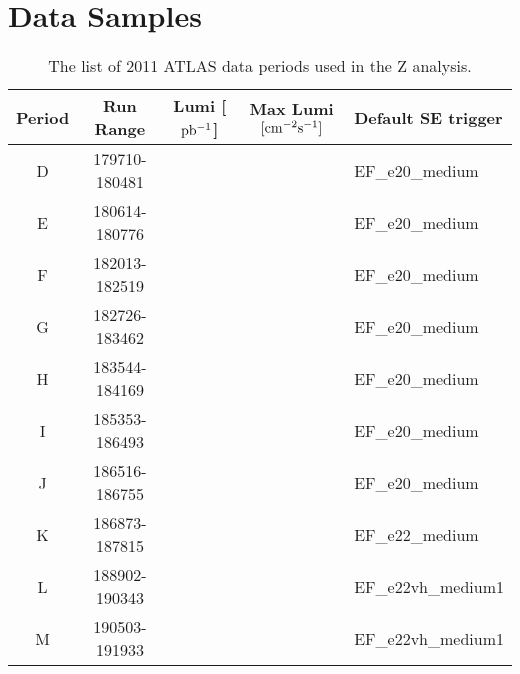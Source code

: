 \chapter{Data Samples}
\label{sec:DataSamples}

\begin{table}[ht!]
\centering
\begin{tabular}{ c | cccl } \hline\hline
Period & Run Range & Lumi [$\rm pb^{-1}$] & Max Lumi $\rm [cm^{-2}s^{-1}]$ & Default SE trigger \\ \hline
D & 179710-180481 & & & EF\_e20\_medium \\
E & 180614-180776 & & & EF\_e20\_medium \\
F & 182013-182519 & & & EF\_e20\_medium \\
G & 182726-183462 & & & EF\_e20\_medium \\
H & 183544-184169 & & & EF\_e20\_medium \\
I & 185353-186493 & & & EF\_e20\_medium \\
J & 186516-186755 & & & EF\_e20\_medium \\
K & 186873-187815 & & & EF\_e22\_medium \\
L & 188902-190343 & & & EF\_e22vh\_medium1 \\
M & 190503-191933 & & & EF\_e22vh\_medium1 \\
\hline
\end{tabular}
\caption{The list of 2011 ATLAS data periods used in the Z analysis.}
\label{tab:data}
\end{table}
